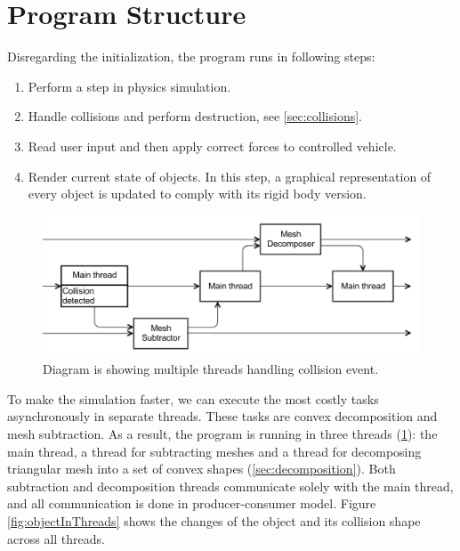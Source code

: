 \section{Program Structure}
Disregarding the initialization, the program runs in following steps:
\begin{enumerate}
\item Perform a step in physics simulation.
\item Handle collisions and perform destruction, see \cref{sec:collisions}.
\item Read user input and then apply correct forces to controlled vehicle.
\item Render current state of objects. In this step, a graphical representation of every object is updated to comply with its rigid body version.
\end{enumerate}

\begin{figure}
        \centering
        \includegraphics[width=\textwidth]{img/decompositionFlow}
        \caption{Diagram is showing multiple threads handling collision event. }
        \label{fig:threads}
\end{figure}
To make the simulation faster, we can  execute the most costly tasks asynchronously in separate threads. These tasks are convex decomposition and mesh subtraction. As a result, the program is running in three threads (\cref{fig:threads}): the main thread, a thread for subtracting meshes and a thread for decomposing triangular mesh into a set of convex shapes (\cref{sec:decomposition}). Both subtraction and decomposition threads communicate solely with the main thread, and all communication is done in producer-consumer model. Figure \ref{fig:objectInThreads} shows the changes of the object and its collision shape across all threads.

